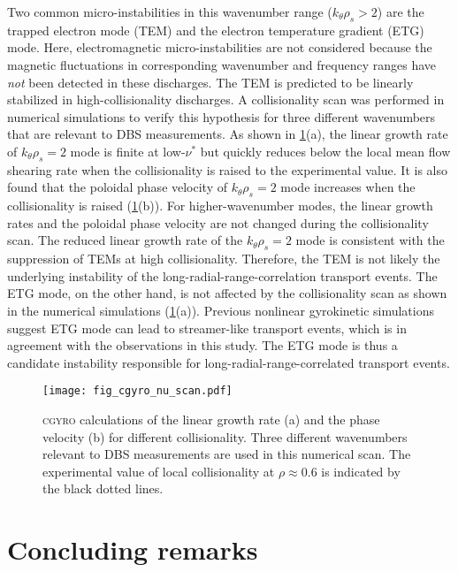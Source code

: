 \documentclass[english,aip,pop,superscriptaddress,preprint,letterpaper]{revtex4-2}
\begin{document}
Two common micro-instabilities in this wavenumber range ($k_{\theta}\rho_{s}>2$) are the trapped electron mode (TEM) and the electron temperature gradient (ETG) mode.\cite{doyleChapterPlasmaConfinement2007}
Here, electromagnetic micro-instabilities are not considered because the magnetic fluctuations in corresponding wavenumber and frequency ranges have \emph{not} been detected in these discharges.
The TEM is predicted to be linearly stabilized in high-collisionality discharges.
A collisionality scan was performed in numerical simulations to verify this hypothesis for three different wavenumbers that are relevant to DBS measurements.
As shown in \cref{fig:nu_scan}(a), the linear growth rate of $k_{\theta}\rho_{s}=2$ mode is finite at low-$\nu^{*}$ but quickly reduces below the local mean flow shearing rate when the collisionality is raised to the experimental value.
It is also found that the poloidal phase velocity of $k_{\theta}\rho_{s}=2$ mode increases when the collisionality is raised (\cref{fig:nu_scan}(b)).
For higher-wavenumber modes, the linear growth rates and the poloidal phase velocity are not changed during the collisionality scan.
The reduced linear growth rate of the $k_{\theta}\rho_{s}=2$ mode is consistent with the suppression of TEMs at high collisionality.
Therefore, the TEM is not likely the underlying instability of the long-radial-range-correlation transport events.
The ETG mode, on the other hand, is not affected by the collisionality scan as shown in the numerical simulations (\cref{fig:nu_scan}(a)).
Previous nonlinear gyrokinetic simulations suggest ETG mode can lead to streamer-like transport events,\cite{dorlandElectronTemperatureGradient2000,jenkoElectronTemperatureGradient2000} which is in agreement with the observations in this study.
The ETG mode is thus a candidate instability responsible for long-radial-range-correlated transport events.

\begin{figure}
  \texttt{[image: fig\_cgyro\_nu\_scan.pdf]}
  \caption{\label{fig:nu_scan} \textsc{cgyro} calculations of the linear growth rate (a) and the phase velocity (b) for different collisionality. Three different wavenumbers relevant to DBS measurements are used in this numerical scan. The experimental value of local collisionality at $\rho\approx0.6$ is indicated by the black dotted lines.}
\end{figure}

\section{Concluding remarks\label{sec:summary}}
\end{document}
